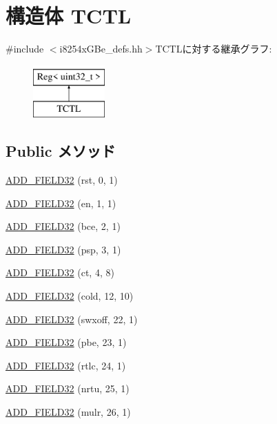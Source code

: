 \hypertarget{structiGbReg_1_1Regs_1_1TCTL}{
\section{構造体 TCTL}
\label{structiGbReg_1_1Regs_1_1TCTL}
}


{\ttfamily \#include $<$i8254xGBe\_\-defs.hh$>$}TCTLに対する継承グラフ:\begin{figure}[H]
\begin{center}
\leavevmode
\includegraphics[height=2cm]{structiGbReg_1_1Regs_1_1TCTL}
\end{center}
\end{figure}
\subsection*{Public メソッド}
\begin{DoxyCompactItemize}
\item 
\hyperlink{structiGbReg_1_1Regs_1_1TCTL_a0dc106893a41122c327230f9290f08cb}{ADD\_\-FIELD32} (rst, 0, 1)
\item 
\hyperlink{structiGbReg_1_1Regs_1_1TCTL_a0d3ee24d460c2635ff314d3fefeb246c}{ADD\_\-FIELD32} (en, 1, 1)
\item 
\hyperlink{structiGbReg_1_1Regs_1_1TCTL_ab0f83bd72aaaeebc089ca6e13e8eb8a4}{ADD\_\-FIELD32} (bce, 2, 1)
\item 
\hyperlink{structiGbReg_1_1Regs_1_1TCTL_a2c01ca4ca1773b5106232f10924baa23}{ADD\_\-FIELD32} (psp, 3, 1)
\item 
\hyperlink{structiGbReg_1_1Regs_1_1TCTL_ab56a77b85e30e0222f05905e3fc6e3cc}{ADD\_\-FIELD32} (ct, 4, 8)
\item 
\hyperlink{structiGbReg_1_1Regs_1_1TCTL_a28dd3c9f0340fff01a40a8706d39a4dd}{ADD\_\-FIELD32} (cold, 12, 10)
\item 
\hyperlink{structiGbReg_1_1Regs_1_1TCTL_a3c074f365298d7bb0cd9a429bb111c36}{ADD\_\-FIELD32} (swxoff, 22, 1)
\item 
\hyperlink{structiGbReg_1_1Regs_1_1TCTL_a8a0eb5868a49d9453482c8ed603fc87c}{ADD\_\-FIELD32} (pbe, 23, 1)
\item 
\hyperlink{structiGbReg_1_1Regs_1_1TCTL_a1c028486363f5db891422e43bb62b075}{ADD\_\-FIELD32} (rtlc, 24, 1)
\item 
\hyperlink{structiGbReg_1_1Regs_1_1TCTL_a58470551bdf7cfff4f7fbd7d518c94dd}{ADD\_\-FIELD32} (nrtu, 25, 1)
\item 
\hyperlink{structiGbReg_1_1Regs_1_1TCTL_a782cdf6a4efbbcfaebf1245cc820cf6b}{ADD\_\-FIELD32} (mulr, 26, 1)
\end{DoxyCompactItemize}


